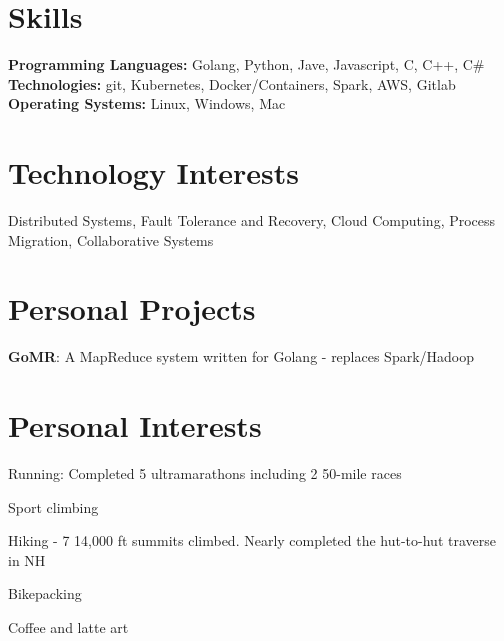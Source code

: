 \documentclass[margin,line]{resume}
\begin{document}
\begin{resume}

\filbreak
\section{\mysidestyle Skills}
\textbf{Programming Languages:} Golang, Python, Jave, Javascript, C, C++, C\#\\
\textbf{Technologies:}  git, Kubernetes, Docker/Containers, Spark, AWS, Gitlab\\
\textbf{Operating Systems:} Linux, Windows, Mac

\section{\mysidestyle Technology Interests}
Distributed Systems, Fault Tolerance and Recovery, Cloud Computing, Process Migration, Collaborative Systems

\section{\mysidestyle Personal Projects}
\textbf{GoMR}: A MapReduce system written for Golang - replaces Spark/Hadoop\\

\section{\mysidestyle Personal Interests}
\begin{list2}
    \item Running: Completed 5 ultramarathons including 2 50-mile races
    \item Sport climbing
    \item Hiking - 7 14,000 ft summits climbed. Nearly completed the hut-to-hut traverse in NH
    \item Bikepacking
    \item Coffee and latte art
\end{list2}



\end{resume}
\end{document}
